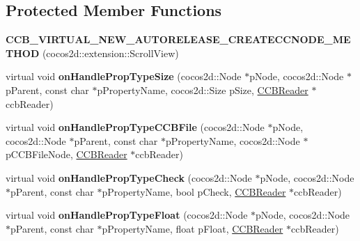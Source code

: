 \subsection*{Protected Member Functions}
\begin{DoxyCompactItemize}
\item 
\mbox{\label{classcocosbuilder_1_1ScrollViewLoader_a0435cffb1c7b5dc42b8aff18565255c0}} 
{\bfseries C\+C\+B\+\_\+\+V\+I\+R\+T\+U\+A\+L\+\_\+\+N\+E\+W\+\_\+\+A\+U\+T\+O\+R\+E\+L\+E\+A\+S\+E\+\_\+\+C\+R\+E\+A\+T\+E\+C\+C\+N\+O\+D\+E\+\_\+\+M\+E\+T\+H\+OD} (cocos2d\+::extension\+::\+Scroll\+View)
\item 
\mbox{\label{classcocosbuilder_1_1ScrollViewLoader_a45851c4dde07271b6696dea8fb032778}} 
virtual void {\bfseries on\+Handle\+Prop\+Type\+Size} (cocos2d\+::\+Node $\ast$p\+Node, cocos2d\+::\+Node $\ast$p\+Parent, const char $\ast$p\+Property\+Name, cocos2d\+::\+Size p\+Size, \hyperlink{classcocosbuilder_1_1CCBReader}{C\+C\+B\+Reader} $\ast$ccb\+Reader)
\item 
\mbox{\label{classcocosbuilder_1_1ScrollViewLoader_ad9cf241ad14c866486ca9b7efa625ee2}} 
virtual void {\bfseries on\+Handle\+Prop\+Type\+C\+C\+B\+File} (cocos2d\+::\+Node $\ast$p\+Node, cocos2d\+::\+Node $\ast$p\+Parent, const char $\ast$p\+Property\+Name, cocos2d\+::\+Node $\ast$p\+C\+C\+B\+File\+Node, \hyperlink{classcocosbuilder_1_1CCBReader}{C\+C\+B\+Reader} $\ast$ccb\+Reader)
\item 
\mbox{\label{classcocosbuilder_1_1ScrollViewLoader_a94bb7acc882d66c55f8b7491eef31b59}} 
virtual void {\bfseries on\+Handle\+Prop\+Type\+Check} (cocos2d\+::\+Node $\ast$p\+Node, cocos2d\+::\+Node $\ast$p\+Parent, const char $\ast$p\+Property\+Name, bool p\+Check, \hyperlink{classcocosbuilder_1_1CCBReader}{C\+C\+B\+Reader} $\ast$ccb\+Reader)
\item 
\mbox{\label{classcocosbuilder_1_1ScrollViewLoader_a9cafca91b8b276c63913ca6e5c69d83c}} 
virtual void {\bfseries on\+Handle\+Prop\+Type\+Float} (cocos2d\+::\+Node $\ast$p\+Node, cocos2d\+::\+Node $\ast$p\+Parent, const char $\ast$p\+Property\+Name, float p\+Float, \hyperlink{classcocosbuilder_1_1CCBReader}{C\+C\+B\+Reader} $\ast$ccb\+Reader)

\end{DoxyCompactItemize}
